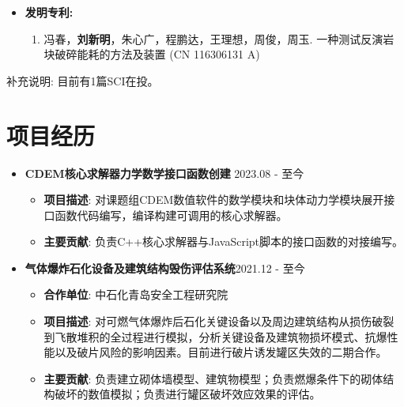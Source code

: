 \documentclass[a4paper,12pt]{extarticle}
\begin{document}
\begin{itemize}
    \item \textbf{发明专利:} 
    \begin{enumerate}
    \item 冯春，\textbf{刘新明}，朱心广，程鹏达，王理想，周俊，周玉. 一种测试反演岩块破碎能耗的方法及装置 (CN 116306131 A)
\end{enumerate}
\end{itemize}
\par  {补充说明: 目前有1篇SCI在投。}
\newpage

\section*{项目经历}
\begin{itemize}
 \item\textbf{CDEM核心求解器力学数学接口函数创建} \hfill {2023.08 - 至今} %
         \begin{itemize}
            \item \textbf{项目描述}: 对课题组CDEM数值软件的数学模块和块体动力学模块展开接口函数代码编写，编译构建可调用的核心求解器。 %
            \item \textbf{主要贡献}: 负责C++核心求解器与JavaScript脚本的接口函数的对接编写。 %
\end{itemize}
\end{itemize}

\begin{itemize}
 \item\textbf{气体爆炸石化设备及建筑结构毁伤评估系统}\hfill 2021.12 - 至今 %
         \begin{itemize}
            \item \textbf{合作单位}: 中石化青岛安全工程研究院 %
            \item \textbf{项目描述}: 对可燃气体爆炸后石化关键设备以及周边建筑结构从损伤破裂到飞散堆积的全过程进行模拟，分析关键设备及建筑物损坏模式、抗爆性能以及破片风险的影响因素。目前进行破片诱发罐区失效的二期合作。 %
            \item \textbf{主要贡献}: 负责建立砌体墙模型、建筑物模型；负责燃爆条件下的砌体结构破坏的数值模拟；负责进行罐区破坏效应效果的评估。 %
\end{itemize}
\end{itemize}
\end{document}

